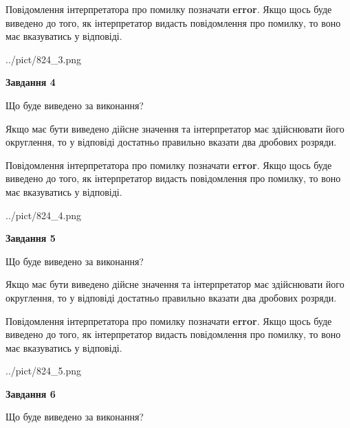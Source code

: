 \documentclass[12pt, ukrainian]{article}
\begin{document}
{\begin {Large}
Повідомлення інтерпретатора про помилку позначати \textbf{error}.
Якщо щось буде виведено до того, як інтерпретатор видасть повідомлення про помилку, 
то воно має вказуватись у відповіді. \par

\begin{center}
	{../pict/824_3.png}
\end{center}
\newpage

{\begin {center}\textbf{Завдання 4}\end {center}}\par
Що буде виведено за виконання? \par

Якщо має бути виведено дійсне значення та інтерпретатор має здійснювати його округлення, 
то у відповіді достатньо правильно вказати два дробових розряди.

Повідомлення інтерпретатора про помилку позначати \textbf{error}.
Якщо щось буде виведено до того, як інтерпретатор видасть повідомлення про помилку, 
то воно має вказуватись у відповіді. \par

\begin{center}
	{../pict/824_4.png}
\end{center}
\newpage

{\begin {center}\textbf{Завдання 5}\end {center}}\par
Що буде виведено за виконання? \par

Якщо має бути виведено дійсне значення та інтерпретатор має здійснювати його округлення, 
то у відповіді достатньо правильно вказати два дробових розряди.

Повідомлення інтерпретатора про помилку позначати \textbf{error}.
Якщо щось буде виведено до того, як інтерпретатор видасть повідомлення про помилку, 
то воно має вказуватись у відповіді. \par

\begin{center}
	{../pict/824_5.png}
\end{center}
\newpage

{\begin {center}\textbf{Завдання 6}\end {center}}\par
Що буде виведено за виконання? \par


\end{Large}}
\end{document}
